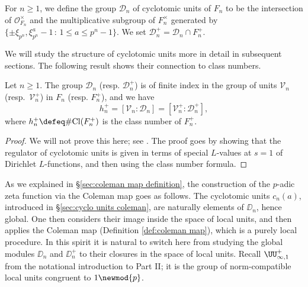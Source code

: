 \documentclass[a4paper,10pt, english, reqno]{smfart}
\numberwithin{equation}{section}
\begin{document}
\begin{definition}
	For $n \geq 1$, we define the group $\mathscr{D}_n$ of cyclotomic units of $F_n$ to be the intersection of $\mathscr{O}_{F_n}^\times$ and the multiplicative subgroup of $F_n^\times$ generated by $\{ \pm \xi_{p^n}, \xi_{p^n}^a - 1 \, : \, 1 \leq a \leq p^n - 1 \}$. We set $\mathscr{D}_n^+ = \mathscr{D}_n \cap F_n^+$.
\end{definition}

We will study the structure of cyclotomic units more in detail in subsequent sections. The following result shows their connection to class numbers.


\begin{theorem} \label{thm:cyclo units class number}
	Let $n \geq 1$. The group $\mathscr{D}_n$ (resp. $\mathscr{D}_n^+$) is of finite index in the group of units $\mathscr{V}_n$ (resp.\ $\mathscr{V}_n^+$) in $F_n$ (resp. $F_n^+$), and we have
	\[ 
	h_n^+ = [ \mathscr{V}_n : \mathscr{D}_n ] = [ \mathscr{V}_n^+ : \mathscr{D}_n^+ ],
	 \]
  where $h_n^+ \defeq \# \mathrm{Cl}(F_n^+)$ is the class number of $F_n^+$.
\end{theorem}

\begin{proof}
	We will not prove this here; see \cite[Theorem 8.2]{Washington2}. The proof goes by showing that the regulator of cyclotomic units is given in terms of special $L$-values at $s = 1$ of Dirichlet $L$-functions, and then using the class number formula. 
\end{proof}

As we explained in \S\ref{sec:coleman map definition}, the construction of the $p$-adic zeta function via the Coleman map goes as follows. The cyclotomic units $c_n(a)$, introduced in \S\ref{sec:cyclo units coleman}, are naturally elements of $\DD_n$, hence global. One then considers their image inside the space of local units, and then applies the Coleman map (Definition \ref{def:coleman map}), which is a purely local procedure. In this spirit it is natural to switch here from studying the global modules $\DD_n$ and $\DD_n^+$ to their closures in the space of local units. Recall $\UU_{\infty,1}^+$ from the notational introduction to Part II; it is the group of norm-compatible local units congruent to $1 \newmod{p}$.

\end{document}
